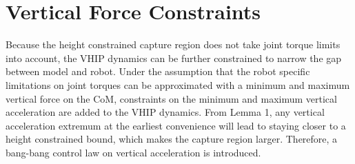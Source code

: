 \section{Vertical Force Constraints}\label{sec:verticalforce}
Because the height constrained capture region does not take joint torque limits into account, the \ac{VHIP} dynamics can be further constrained to narrow the gap between model and robot. Under the assumption that the robot specific limitations on joint torques can be approximated with a minimum and maximum vertical force on the \ac{CoM}, constraints on the minimum and maximum vertical acceleration are added to the \ac{VHIP} dynamics. From Lemma 1, any vertical acceleration extremum at the earliest convenience will lead to staying closer to a height constrained bound, which makes the capture region larger. Therefore, a bang-bang control law on vertical acceleration is introduced.
     
